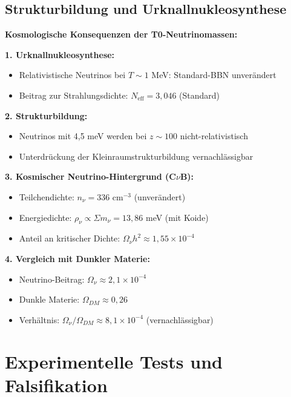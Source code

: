 	\subsection{Strukturbildung und Urknallnukleosynthese}
	
	\begin{keyresult}
		\textbf{Kosmologische Konsequenzen der T0-Neutrinomassen:}
		
		\textbf{1. Urknallnukleosynthese:}
		\begin{itemize}
			\item Relativistische Neutrinos bei $T \sim 1$ MeV: Standard-BBN unverändert
			\item Beitrag zur Strahlungsdichte: $N_{\text{eff}} = 3,046$ (Standard)
		\end{itemize}
		
		\textbf{2. Strukturbildung:}
		\begin{itemize}
			\item Neutrinos mit 4,5 meV werden bei $z \sim 100$ nicht-relativistisch
			\item Unterdrückung der Kleinraumstrukturbildung vernachlässigbar
		\end{itemize}
		
		\textbf{3. Kosmischer Neutrino-Hintergrund (C$\nu$B):}
		\begin{itemize}
			\item Teilchendichte: $n_\nu = 336$ cm$^{-3}$ (unverändert)
			\item Energiedichte: $\rho_\nu \propto \Sigma m_\nu = 13,86$ meV (mit Koide)
			\item Anteil an kritischer Dichte: $\Omega_\nu h^2 \approx 1,55 \times 10^{-4}$
		\end{itemize}
		
		\textbf{4. Vergleich mit Dunkler Materie:}
		\begin{itemize}
			\item Neutrino-Beitrag: $\Omega_\nu \approx 2,1 \times 10^{-4}$
			\item Dunkle Materie: $\Omega_{DM} \approx 0,26$
			\item Verhältnis: $\Omega_\nu/\Omega_{DM} \approx 8,1 \times 10^{-4}$ (vernachlässigbar)
		\end{itemize}
	\end{keyresult}
	
	\section{Experimentelle Tests und Falsifikation}
	
